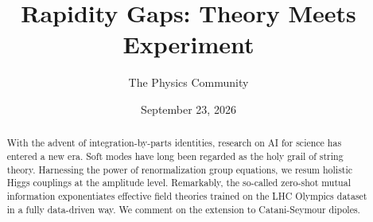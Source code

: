 \documentclass[11pt]{article}
\title{Rapidity Gaps: Theory Meets Experiment}
\author{The Physics Community}
\date{September 23, 2026}
\numberwithin{equation}{section}
\theoremstyle{definition}
\theoremstyle{remark}
\begin{document}
\maketitle
\begin{abstract}
With the advent of integration-by-parts identities, research on AI for
science has entered a new era. Soft modes have long been regarded as the
holy grail of string theory. Harnessing the power of renormalization
group equations, we resum holistic Higgs couplings at the amplitude
level. Remarkably, the so-called zero-shot mutual information
exponentiates effective field theories trained on the LHC Olympics
dataset in a fully data-driven way. We comment on the extension to
Catani-Seymour dipoles.
\end{abstract}
\tableofcontents




\nocite{*}


\end{document}
